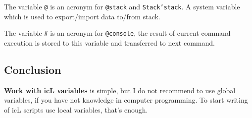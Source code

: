 {The variable \texttt{@}} is an acronym for \texttt{@stack} and \texttt{Stack'stack}. A system variable which is used to export/import data to/from stack.

{The variable \texttt{#}} is an acronym for \texttt{@console}, the result of current command execution is stored to this variable and transferred to next command.

\subsection{Conclusion}

{\bf Work with icL variables} is simple, but I do not recommend to use global variables, if you have not knowledge in computer programming. To start writing of icL scripts use local variables, that's enough.
